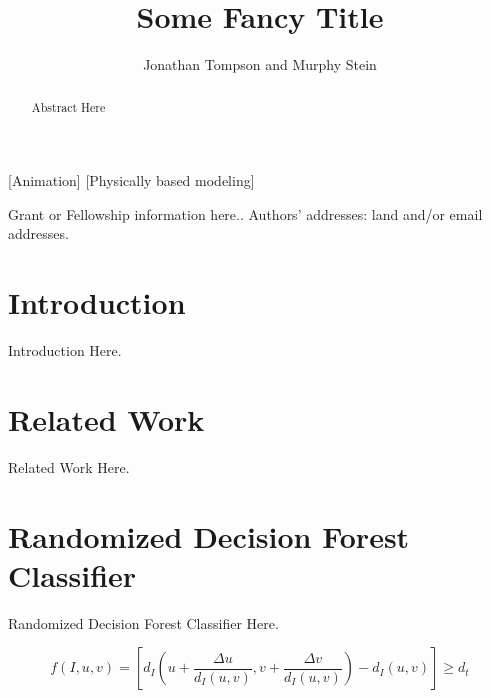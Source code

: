 \documentclass{acmtog}
\begin{document}

\title{Some Fancy Title} %

\author{Jonathan Tompson {\upshape and} Murphy Stein }

[Animation]
[Physically based modeling]




\maketitle

\begin{bottomstuff}
Grant or Fellowship information here..
Authors' addresses: land and/or email addresses.
\end{bottomstuff}


\begin{abstract}
  Abstract Here
\end{abstract}

\section{Introduction}
\label{sec:introduction}

Introduction Here.

\section{Related Work}
\label{sec:relatedwork}

Related Work Here.

\section{Randomized Decision Forest Classifier}
\label{sec:randomizeddecisionforestclassifier}

Randomized Decision Forest Classifier Here.

\begin{equation}
\textstyle
f\left(I, u, v\right)=\left[d_I\left(u + \frac{\Delta u}{d_I\left(u,v\right)}, v + \frac{\Delta v}{d_I\left(u,v\right)}\right) - d_I\left(u,v\right)\right]\geq d_{t}
\end{equation}
\end{document}
